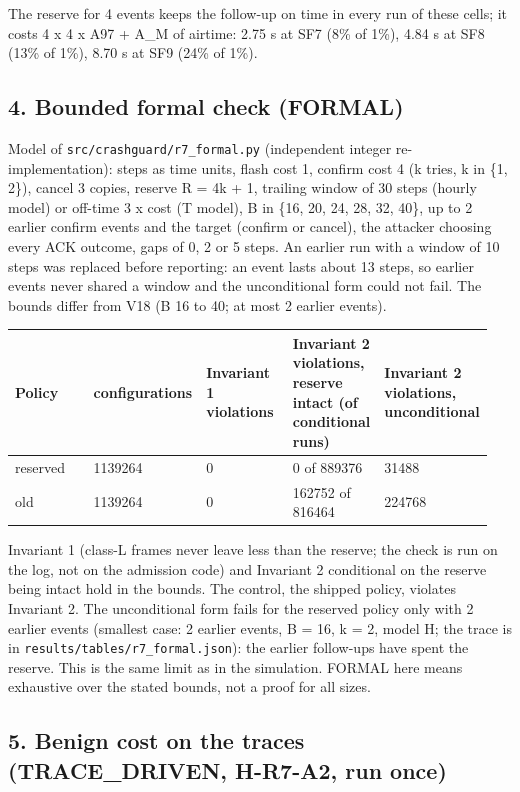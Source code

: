 The reserve for 4 events keeps the follow-up on time in every run of these cells; it costs 4 x 4 x A97 + A\_M of airtime: 2.75 s at SF7 (8\% of 1\%), 4.84 s at SF8 (13\% of 1\%), 8.70 s at SF9 (24\% of 1\%).

\subsection*{4. Bounded formal check (FORMAL)}

Model of \texttt{src/crashguard/r7\_formal.py} (independent integer re-implementation): steps as time units, flash cost 1, confirm cost 4 (k tries, k in \{1, 2\}), cancel 3 copies, reserve R = 4k + 1, trailing window of 30 steps (hourly model) or off-time 3 x cost (T model), B in \{16, 20, 24, 28, 32, 40\}, up to 2 earlier confirm events and the target (confirm or cancel), the attacker choosing every ACK outcome, gaps of 0, 2 or 5 steps. An earlier run with a window of 10 steps was replaced before reporting: an event lasts about 13 steps, so earlier events never shared a window and the unconditional form could not fail. The bounds differ from V18 (B 16 to 40; at most 2 earlier events).

{\scriptsize\raggedright
\begin{longtable}{p{0.190\linewidth}p{0.190\linewidth}p{0.190\linewidth}p{0.190\linewidth}p{0.190\linewidth}}
\toprule
Policy & configurations & Invariant 1 violations & Invariant 2 violations, reserve intact (of conditional runs) & Invariant 2 violations, unconditional \\
\midrule
\endhead
reserved & 1139264 & 0 & 0 of 889376 & 31488 \\
old & 1139264 & 0 & 162752 of 816464 & 224768 \\
\bottomrule
\end{longtable}}

Invariant 1 (class-L frames never leave less than the reserve; the check is run on the log, not on the admission code) and Invariant 2 conditional on the reserve being intact hold in the bounds. The control, the shipped policy, violates Invariant 2. The unconditional form fails for the reserved policy only with 2 earlier events (smallest case: 2 earlier events, B = 16, k = 2, model H; the trace is in \texttt{results/tables/r7\_formal.json}): the earlier follow-ups have spent the reserve. This is the same limit as in the simulation. FORMAL here means exhaustive over the stated bounds, not a proof for all sizes.

\subsection*{5. Benign cost on the traces (TRACE\_DRIVEN, H-R7-A2, run once)}

